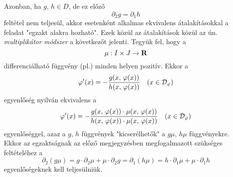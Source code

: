 Azonban, ha $g, \, h \in D$, de ez előző
\[
	\partial_2g = \partial_1 h
\]
feltétel nem teljesül, akkor esetenként alkalmas ekvivalens átalakításokkal a feladat "egzakt alakra hozható". Ezek közül az átalakítások közül az ún. \textit{multiplikátor módszer} a következőt jelenti. Tegyük fel, hogy a
\[
	\mu : I \times J \to \mathbf{R}
\]
differenciálható függvény (pl.) minden helyen pozitív. Ekkor a
\[
	\varphi'(x) = - \frac{g(x, \, \varphi(x))}{h(x, \, \varphi(x))} \quad (x \in \mathcal{D}_\varphi)
\]
egyenlőség nyilván ekvivalens a
\[
	\varphi'(x) = - \frac{g(x, \, \varphi(x)) \cdot \mu(x, \, \varphi(x))}{h(x, \, \varphi(x)) \cdot \mu(x, \, \varphi(x))} \quad (x \in \mathcal{D}_\varphi)
\]
egyenlőséggel, azaz a $g, \, h$ függvények "kicserélhetők" a $g\mu, \, h\mu$ függvényekre. Ekkor az egzaktságnak az előző megjegyzésben megfogalmazott szükséges feltételéhez a
\[
	\partial_2(g\mu) = g \cdot \partial_2 \mu + \mu \cdot \partial_2 g = \partial_1 (h \mu) = h \cdot \partial_1 \mu + \mu \cdot \partial_1 h
\]
egyenlőségeknek kell teljesülniük. 